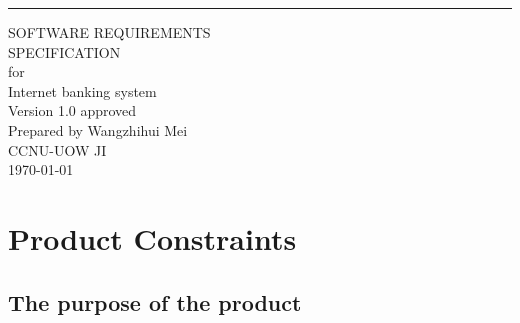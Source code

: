 \documentclass{scrreprt}
\date{}
\def\myversion{1.0 }
\begin{document}
\begin{flushright}
    \rule{16cm}{5pt}\vskip1cm
    \begin{bfseries}
        \Huge{SOFTWARE REQUIREMENTS\\ SPECIFICATION}\\
        \vspace{1.9cm}
        for\\
        \vspace{1.9cm}
        Internet banking system\\
        \vspace{1.9cm}
        \LARGE{Version \myversion approved}\\
        \vspace{1.9cm}
        Prepared by Wangzhihui Mei\\
        \vspace{1.9cm}
        CCNU-UOW JI\\
        \vspace{1.9cm}
        \today\\
    \end{bfseries}
\end{flushright}

\tableofcontents




\chapter{Product Constraints}

\section{The purpose of the product}
\end{document}
